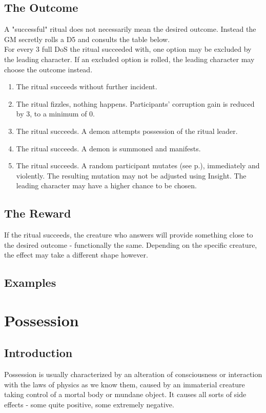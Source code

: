 \documentclass[11pt,a4paper,openany]{book}
\begin{document}
	\section{The Outcome}
	A "successful" ritual does not necessarily mean the desired outcome. Instead the GM secretly rolls a D5 and consults the table below.\\
	For every 3 full DoS the ritual succeeded with, one option may be excluded by the leading character. If an excluded option is rolled, the leading character may choose the outcome instead.
	\par
	\vspace{-5mm}
	\begin{enumerate}
		\raggedright
		\setlength\itemsep{-8mm}
		\item The ritual succeeds without further incident.
		\item The ritual fizzles, nothing happens. Participants' corruption gain is reduced by 3, to a minimum of 0.
		\item The ritual succeeds. A demon attempts possession of the ritual leader.
		\item The ritual succeeds. A demon is summoned and manifests.
		\item The ritual succeeds. A random participant mutates (see p.\pageref{ch:mutation}), immediately and violently.
		The resulting mutation may not be adjusted using Insight.
		The leading character may have a higher chance to be chosen.
	\end{enumerate}
	\section{The Reward}
	If the ritual succeeds, the creature who answers will provide something close to the desired outcome - functionally the same.
	Depending on the specific creature, the effect may take a different shape however.
	\section{Examples}
	
	
	\chapter{Possession}
	\section*{Introduction}
	Possession is usually characterized by
		an alteration of consciousness or interaction with the laws of physics as we know them,
		caused by an immaterial creature taking control of a mortal body or mundane object.
	It causes all sorts of side effects
		- some quite positive, some extremely negative.
	
	
	
\end{document}
